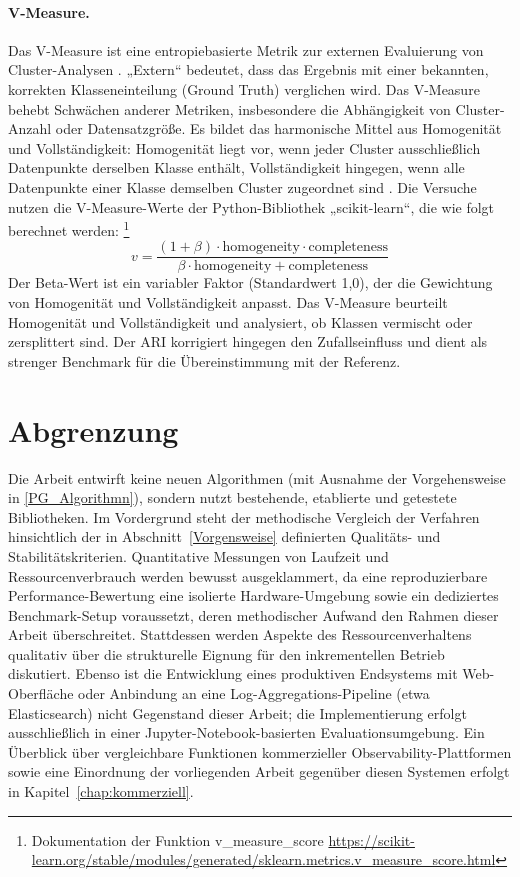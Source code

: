 \paragraph{V-Measure.}
Das V-Measure ist eine entropiebasierte Metrik zur externen Evaluierung von Cluster-Analysen \cite{inproceedings}. „Extern“ bedeutet, dass das Ergebnis mit einer bekannten, korrekten Klasseneinteilung (Ground Truth) verglichen wird. Das V-Measure behebt Schwächen anderer Metriken, insbesondere die Abhängigkeit von Cluster-Anzahl oder Datensatzgröße. Es bildet das harmonische Mittel aus Homogenität und Vollständigkeit: Homogenität liegt vor, wenn jeder Cluster ausschließlich Datenpunkte derselben Klasse enthält, Vollständigkeit hingegen, wenn alle Datenpunkte einer Klasse demselben Cluster zugeordnet sind \cite[S.~410]{inproceedings}.
Die Versuche nutzen die V-Measure-Werte der Python-Bibliothek „scikit-learn“, die wie folgt berechnet werden: \footnote{Dokumentation der Funktion v\_measure\_score \url{https://scikit-learn.org/stable/modules/generated/sklearn.metrics.v_measure_score.html}}
\begin{equation*}
  v = \frac{(1 + \beta) \cdot \text{homogeneity} \cdot \text{completeness}}{\beta \cdot \text{homogeneity} + \text{completeness}}
\end{equation*}
Der Beta-Wert ist ein variabler Faktor (Standardwert 1,0), der die Gewichtung von Homogenität und Vollständigkeit anpasst.
Das V-Measure beurteilt Homogenität und Vollständigkeit und analysiert, ob Klassen vermischt oder zersplittert sind. Der ARI korrigiert hingegen den Zufallseinfluss und dient als strenger Benchmark für die Übereinstimmung mit der Referenz.


\section{Abgrenzung}
Die Arbeit entwirft keine neuen Algorithmen (mit Ausnahme der Vorgehensweise in \ref{PG_Algorithmn}), sondern nutzt bestehende, etablierte und getestete Bibliotheken. Im Vordergrund steht der methodische Vergleich der Verfahren hinsichtlich der in Abschnitt~\ref{Vorgensweise} definierten Qualitäts- und Stabilitätskriterien. Quantitative Messungen von Laufzeit und Ressourcenverbrauch werden bewusst ausgeklammert, da eine reproduzierbare Performance-Bewertung eine isolierte Hardware-Umgebung sowie ein dediziertes Benchmark-Setup voraussetzt, deren methodischer Aufwand den Rahmen dieser Arbeit überschreitet. Stattdessen werden Aspekte des Ressourcenverhaltens qualitativ über die strukturelle Eignung für den inkrementellen Betrieb diskutiert. Ebenso ist die Entwicklung eines produktiven Endsystems mit Web-Oberfläche oder Anbindung an eine Log-Aggregations-Pipeline (etwa Elasticsearch) nicht Gegenstand dieser Arbeit; die Implementierung erfolgt ausschließlich in einer Jupyter-Notebook-basierten Evaluationsumgebung. Ein Überblick über vergleichbare Funktionen kommerzieller Observability-Plattformen sowie eine Einordnung der vorliegenden Arbeit gegenüber diesen Systemen erfolgt in Kapitel~\ref{chap:kommerziell}.


